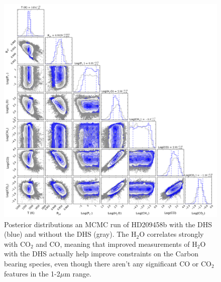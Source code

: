 \documentclass[iop]{emulateapj}
\begin{document}

\begin{figure}
\centering
\includegraphics[width=1.0\textwidth]{HD209458b_solar_clear_1trans_corner.png}
\caption{Posterior distributions an MCMC run of HD209458b with the DHS (blue) and without the DHS (gray).
The H$_2$O correlates strongly with CO$_2$ and CO, meaning that improved measurements of H$_2$O with the DHS actually help improve constraints on the Carbon bearing species, even though there aren't any significant CO or CO$_2$ features in the 1-2$\mu$m range.}\label{fig:cornerRun}
\end{figure}
\end{document}
